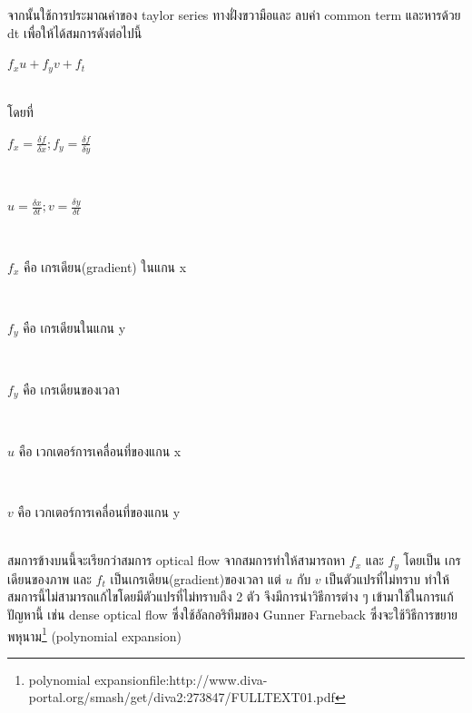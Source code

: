 จากนั้นใช้การประมาณค่าของ taylor series ทางฝั่งขวามือและ ลบค่า common term และหารด้วย dt เพื่อให้ได้สมการดังต่อไปนี้
\\
\centerline{$f_{x}u + f_{y}v + f_{t} $}				\\
โดยที่
\\
\centerline{$f_{x} = \frac{\delta f}{\delta x} ; f_{y} = \frac{\delta f}{\delta y}$} 	\\
\centerline{$u = \frac{\delta x}{\delta t} ; v = \frac{\delta y}{\delta t}$}	 	\\
\centerline{$f_{x}$ คือ เกรเดียน(gradient) ในแกน x} 		\\
\centerline{$f_{y}$ คือ เกรเดียนในแกน y} 		\\
\centerline{$f_{y}$ คือ เกรเดียนของเวลา} 		\\
\centerline{$u$ คือ เวกเตอร์การเคลื่อนที่ของแกน x} 	\\
\centerline{$v$ คือ เวกเตอร์การเคลื่อนที่ของแกน y} 	\\

สมการข้างบนนี้จะเรียกว่าสมการ optical flow จากสมการทำให้สามารถหา $f_{x}$ และ $f_{y}$ โดยเป็น เกรเดียนของภาพ และ  $f_{t}$ เป็นเกรเดียน(gradient)ของเวลา แต่ $u$ กับ $v$ เป็นตัวแปรที่ไม่ทราบ ทำให้สมการนี้ไม่สามารถแก้ไขโดยมีตัวแปรที่ไม่ทราบถึง 2 ตัว จึงมีการนำวิธีการต่าง ๆ เข้ามาใช้ในการแก้ปัญหานี้ เช่น dense optical flow ซึ่งใช้อัลกอริทึมของ Gunner Farneback ซึ่งจะใช้วิธีการขยายพหุนาม\footnote{polynomial expansionfile:http://www.diva-portal.org/smash/get/diva2:273847/FULLTEXT01.pdf} (polynomial expansion)

